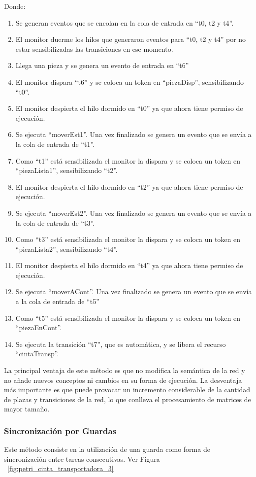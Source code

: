 Donde:\\
\begin{enumerate}
	\item Se generan eventos que se encolan en la cola de entrada en “t0, t2 y
		t4”.
	\item El monitor duerme los hilos que generaron eventos para “t0, t2 y t4” por
		no estar sensibilizadas las transiciones en ese momento.
	\item Llega una pieza y se genera un evento de entrada en “t6”
	\item El monitor dispara “t6” y se coloca un token en “piezaDisp”,
		sensibilizando “t0”.
	\item El monitor despierta el hilo dormido en “t0” ya que ahora tiene permiso
		de ejecución.
	\item Se ejecuta “moverEst1”. Una vez finalizado se genera un evento que se
		envía a la cola de entrada de “t1”.
	\item Como “t1” está sensibilizada el monitor la dispara y se coloca un token
		en “piezaLista1”, sensibilizando “t2”.
	\item El monitor despierta el hilo dormido en “t2” ya que ahora tiene permiso
		de ejecución.
	\item Se ejecuta “moverEst2”. Una vez finalizado se genera un evento que se
		envía a la cola de entrada de “t3”.
	\item Como “t3” está sensibilizada el monitor la dispara y se coloca un token
		en “piezaLista2”, sensibilizando “t4”.
	\item El monitor despierta el hilo dormido en “t4” ya que ahora tiene permiso
		de ejecución.
	\item Se ejecuta “moverACont”. Una vez finalizado se genera un evento que se
		envía a la cola de entrada de “t5”
	\item Como “t5” está sensibilizada el monitor la dispara y se coloca un token
		en ``piezaEnCont''.
	\item Se ejecuta la transición ``t7'', que es automática, y se libera el
		recurso ``cintaTransp''.
\end{enumerate}
La principal ventaja de este método es que no modifica la semántica de la red y
no añade nuevos conceptos ni cambios en su forma de ejecución.
La desventaja más importante es que puede provocar un incremento considerable de
la cantidad de plazas y transiciones de la red, lo que conlleva el
procesamiento de matrices de mayor tamaño.

\subsubsection{Sincronización por Guardas}
Este método consiste en la utilización de una guarda como forma de
sincronización entre tareas consecutivas. Ver Figura ~\ref{fig:petri_cinta_transportadora_3}

